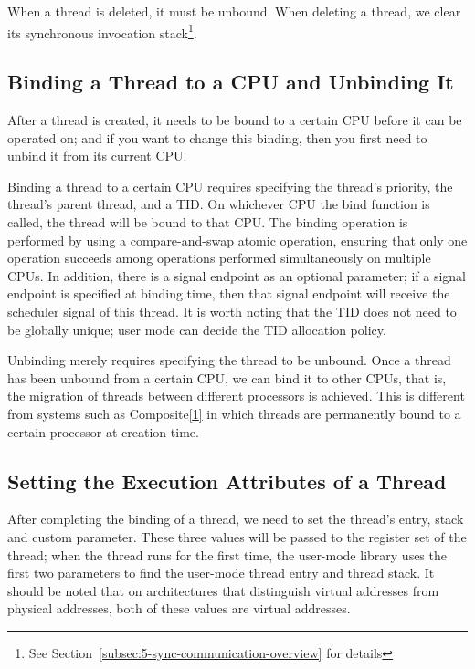 When a thread is deleted, it must be unbound. When deleting a thread, we clear its synchronous invocation stack\footnote{See Section~\ref{subsec:5-sync-communication-overview} for details}.

\subsection{Binding a Thread to a CPU and Unbinding It}\label{subsec:4-bind-thread-to-cpu-and-unbind}

After a thread is created, it needs to be bound to a certain CPU before it can be operated on; and if you want to change this binding, then you first need to unbind it from its current CPU.

Binding a thread to a certain CPU requires specifying the thread's priority, the thread's parent thread, and a TID. On whichever CPU the bind function is called, the thread will be bound to that CPU. The binding operation is performed by using a compare-and-swap atomic operation, ensuring that only one operation succeeds among operations performed simultaneously on multiple CPUs. In addition, there is a signal endpoint as an optional parameter; if a signal endpoint is specified at binding time, then that signal endpoint will receive the scheduler signal of this thread. It is worth noting that the TID does not need to be globally unique; user mode can decide the TID allocation policy.

Unbinding merely requires specifying the thread to be unbound. Once a thread has been unbound from a certain CPU, we can bind it to other CPUs, that is, the migration of threads between different processors is achieved. This is different from systems such as Composite\hyperref[cite:4-1]{{[}1{]}} in which threads are permanently bound to a certain processor at creation time.

\subsection{Setting the Execution Attributes of a Thread}\label{subsec:4-thread-execution-attributes}

After completing the binding of a thread, we need to set the thread's entry, stack and custom parameter. These three values will be passed to the register set of the thread; when the thread runs for the first time, the user-mode library uses the first two parameters to find the user-mode thread entry and thread stack. It should be noted that on architectures that distinguish virtual addresses from physical addresses, both of these values are virtual addresses.

